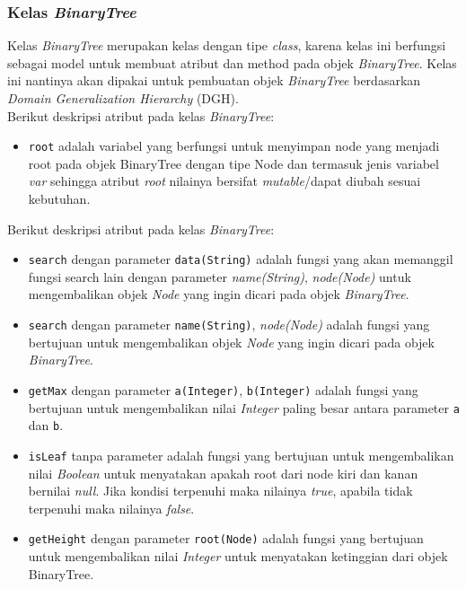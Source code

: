 \newpage
\subsubsection{Kelas \textit{BinaryTree}}
Kelas \textit{BinaryTree} merupakan kelas dengan tipe \textit{class}, karena kelas ini berfungsi sebagai model untuk membuat atribut dan method pada objek \textit{BinaryTree}. Kelas ini nantinya akan dipakai untuk pembuatan objek \textit{BinaryTree} berdasarkan \textit{Domain Generalization Hierarchy} (DGH).\\

\noindent  Berikut deskripsi atribut pada kelas \textit{BinaryTree}:

\begin{itemize}

\item \texttt{root} adalah variabel yang berfungsi untuk menyimpan node yang menjadi root pada objek BinaryTree dengan tipe Node dan termasuk jenis variabel \textit{var} sehingga atribut \textit{root} nilainya bersifat \textit{mutable}/dapat diubah sesuai kebutuhan.

\end{itemize}

\noindent  Berikut deskripsi atribut pada kelas \textit{BinaryTree}:

\begin{itemize}

\item \texttt{search} dengan parameter \texttt{data(String)} adalah fungsi yang akan memanggil fungsi search lain dengan parameter \textit{name(String)}, \textit{node(Node)} untuk mengembalikan objek \textit{Node} yang ingin dicari pada objek \textit{BinaryTree}.

\item \texttt{search} dengan parameter \texttt{name(String)}, \textit{node(Node)} adalah fungsi yang bertujuan untuk mengembalikan objek \textit{Node} yang ingin dicari pada objek \textit{BinaryTree}.

\item \texttt{getMax} dengan parameter \texttt{a(Integer)}, \texttt{b(Integer)} adalah fungsi yang bertujuan untuk mengembalikan nilai \textit{Integer} paling besar antara parameter \texttt{a} dan \texttt{b}.

\item \texttt{isLeaf} tanpa parameter adalah fungsi yang bertujuan untuk mengembalikan nilai \textit{Boolean} untuk menyatakan apakah root dari node kiri dan kanan bernilai \textit{null}. Jika kondisi terpenuhi maka nilainya \textit{true}, apabila tidak terpenuhi maka nilainya \textit{false}.

\item \texttt{getHeight} dengan parameter \texttt{root(Node)} adalah fungsi yang bertujuan untuk mengembalikan nilai \textit{Integer} untuk menyatakan ketinggian dari objek BinaryTree.

\end{itemize}

